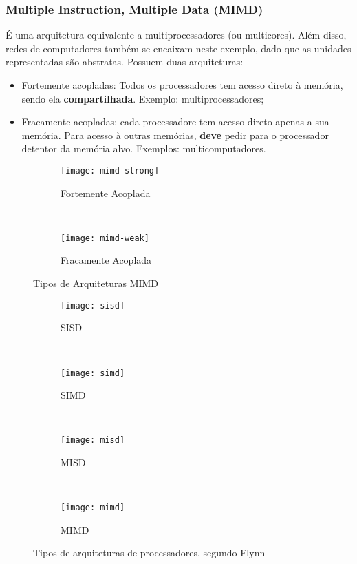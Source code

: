 \subsubsection{Multiple Instruction, Multiple Data (MIMD)}
É uma arquitetura equivalente a multiprocessadores (ou multicores). Além disso, redes de computadores também se encaixam neste exemplo, dado que as unidades representadas são abstratas. Possuem duas arquiteturas:

\begin{itemize}
  \item Fortemente acopladas: Todos os processadores tem acesso direto à memória, sendo ela \textbf{compartilhada}. Exemplo: multiprocessadores;

  \item Fracamente acopladas: cada processadore tem acesso direto apenas a sua memória. Para acesso à outras memórias, \textbf{deve} pedir para o processador detentor da memória alvo. Exemplos: multicomputadores.
\end{itemize}

\begin{figure*}
  \begin{subfigure}{.5\textwidth}
    \centering
    \texttt{[image: mimd-strong]}
    \caption{Fortemente Acoplada}
  \end{subfigure}
  ~
  \begin{subfigure}{.5\textwidth}
    \centering
    \texttt{[image: mimd-weak]}
    \caption{Fracamente Acoplada}
  \end{subfigure}

  \caption{Tipos de Arquiteturas MIMD}
\end{figure*}

\begin{figure*}
  \begin{subfigure}{.5\textwidth}
    \centering
    \texttt{[image: sisd]}
    \caption{SISD}
  \end{subfigure}
  ~
  \begin{subfigure}{.5\textwidth}
    \centering
    \texttt{[image: simd]}
    \caption{SIMD}
  \end{subfigure}
  ~
  \begin{subfigure}{.5\textwidth}
    \centering
    \texttt{[image: misd]}
    \caption{MISD}
  \end{subfigure}
  ~
  \begin{subfigure}{.5\textwidth}
    \centering
    \texttt{[image: mimd]}
    \caption{MIMD}
  \end{subfigure}

  \caption{Tipos de arquiteturas de processadores, segundo Flynn}
  \label{figs:arch-procs}
\end{figure*}




